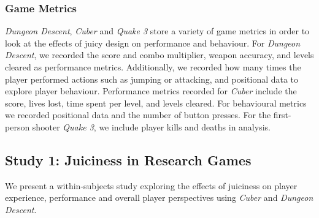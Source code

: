\documentclass{sigchi}
\begin{document}
\subsubsection{Game Metrics}
\textit{Dungeon Descent}, \textit{Cuber} and \textit{Quake 3} store a variety of game metrics in order to look at the effects of juicy design on performance and behaviour. For \textit{Dungeon Descent}, we recorded the score and combo multiplier, weapon accuracy, and levels cleared as performance metrics. Additionally, we recorded how many times the player performed actions such as jumping or attacking, and positional data to explore player behaviour. Performance metrics recorded for \textit{Cuber} include the score, lives lost, time spent per level, and levels cleared. For behavioural metrics we recorded positional data and the number of button presses. For the first-person shooter \textit{Quake 3}, we include player kills and deaths in analysis.

\subsection{Study 1: Juiciness in Research Games}
We present a within-subjects study exploring the effects of juiciness on player experience, performance and overall player perspectives using \textit{Cuber} and \textit{Dungeon Descent}.
\end{document}
